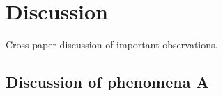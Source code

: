\section{Discussion}
Cross-paper discussion of important observations.

\subsection{Discussion of phenomena A}